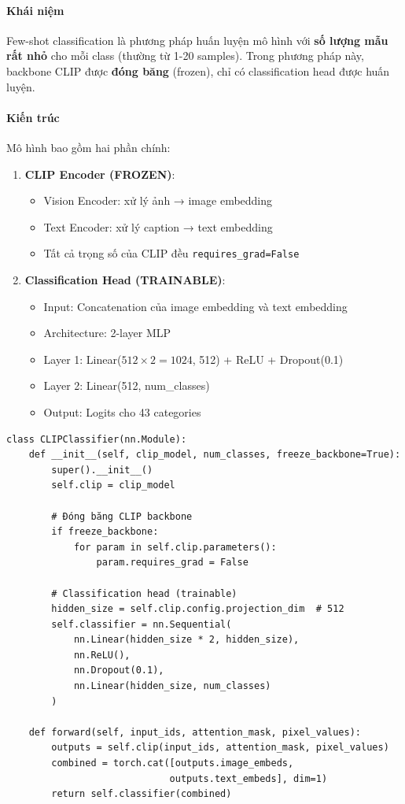 \paragraph{Khái niệm}
Few-shot classification là phương pháp huấn luyện mô hình với \textbf{số lượng mẫu rất nhỏ} cho mỗi class (thường từ 1-20 samples). Trong phương pháp này, backbone CLIP được \textbf{đóng băng} (frozen), chỉ có classification head được huấn luyện.

\paragraph{Kiến trúc}
Mô hình bao gồm hai phần chính:

\begin{enumerate}
    \item \textbf{CLIP Encoder (FROZEN)}:
    \begin{itemize}
        \item Vision Encoder: xử lý ảnh → image embedding
        \item Text Encoder: xử lý caption → text embedding
        \item Tất cả trọng số của CLIP đều \texttt{requires\_grad=False}
    \end{itemize}

    \item \textbf{Classification Head (TRAINABLE)}:
    \begin{itemize}
        \item Input: Concatenation của image embedding và text embedding
        \item Architecture: 2-layer MLP
        \item Layer 1: Linear($512 \times 2 = 1024$, 512) + ReLU + Dropout(0.1)
        \item Layer 2: Linear(512, num\_classes)
        \item Output: Logits cho 43 categories
    \end{itemize}
\end{enumerate}

\begin{verbatim}
class CLIPClassifier(nn.Module):
    def __init__(self, clip_model, num_classes, freeze_backbone=True):
        super().__init__()
        self.clip = clip_model

        # Đóng băng CLIP backbone
        if freeze_backbone:
            for param in self.clip.parameters():
                param.requires_grad = False

        # Classification head (trainable)
        hidden_size = self.clip.config.projection_dim  # 512
        self.classifier = nn.Sequential(
            nn.Linear(hidden_size * 2, hidden_size),
            nn.ReLU(),
            nn.Dropout(0.1),
            nn.Linear(hidden_size, num_classes)
        )

    def forward(self, input_ids, attention_mask, pixel_values):
        outputs = self.clip(input_ids, attention_mask, pixel_values)
        combined = torch.cat([outputs.image_embeds,
                             outputs.text_embeds], dim=1)
        return self.classifier(combined)
\end{verbatim}

